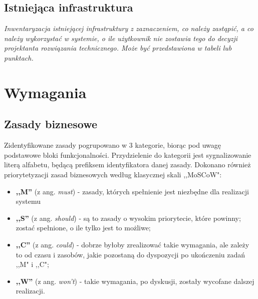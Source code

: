 \documentclass[11pt,oneside,a4paper,titlepage,onecolumn]{article}
\begin{document}
\subsection{Istniejąca infrastruktura}

\textit{Inwentaryzacja istniejącej infrastruktury z zaznaczeniem, co należy zastąpić, a co należy wykorzystać w systemie, o ile użytkownik nie zostawia tego do decyzji projektanta rozwiązania technicznego. Może być przedstawiona w tabeli lub punktach.}

\section{Wymagania}

\subsection{Zasady biznesowe}

Zidentyfikowane zasady pogrupowano w 3 kategorie, biorąc pod uwagę podstawowe bloki funkcjonalności. Przydzielenie
do kategorii jest sygnalizowanie literą alfabetu, będącą prefiksem identyfikatora danej zasady. Dokonano
również priorytetyzacji zasad biznesowych według klasycznej skali ,,MoSCoW":

\begin{itemize}
	\item \textbf{,,M''} (z ang. \textit{must}) - zasady, których spełnienie jest niezbędne dla realizacji systemu
	\item \textbf{,,S''} (z ang. \textit{should}) - są to zasady o wysokim priorytecie, które powinny;
	zostać spełnione, o ile tylko jest to możliwe;
	\item \textbf{,,C''} (z ang. \textit{could}) - dobrze byłoby zrealizować takie wymagania, ale zależy to od czasu
	i zasobów, jakie pozostaną do dyspozycji po ukończeniu zadań ,,M" i ,,C";
	\item \textbf{,,W''} (z ang. \textit{won't}) - takie wymagania, po dyskusji, zostały wycofane dalszej realizacji.
\end{itemize}
\end{document}
